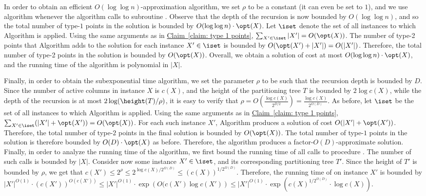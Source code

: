\documentclass[11pt]{article}
\numberwithin{equation}{section}
\theoremstyle{definition}
\theoremstyle{plain}
\newcommand{\expref}[2]{\hyperref[#2]{#1~\ref{#2}}}
\begin{document}
In order to obtain an efficient $O(\log\log n)$-approximation algorithm, we set $\rho$ to be a constant (it can even be set to $1$), and we use  algorithm \leafBST whenever the algorithm calls to subroutine \leafBST. Observe that the depth of the recursion is now bounded by $O(\log\log n)$, and so the total number of type-$1$ points in the solution is bounded by $O(\log\log n)\cdot \opt(X)$. Let $\iset$ denote the set of all instances to which Algorithm \leafBST is applied. Using the same arguments as in \expref{Claim}{claim: type 1 points}, $\sum_{X'\in \iset}|X'|=O(\opt(X))$. The number of type-2 points that Algorithm \leafBST adds to the solution for each instance $X'\in \iset$ is bounded by $O(\opt(X') + |X'|)=O(|X'|)$. Therefore, the total number of type-2 points in the solution is bounded by $O(\opt(X))$. Overall, we obtain a solution of cost at most $O(\log\log n)\cdot \opt(X)$, and the running time of the algorithm is polynomial in $|X|$.


Finally, in order to obtain the subexponential time algorithm, we set the parameter $\rho$ to be such that the recursion depth is bounded by $D$. 
Since the number of active columns in instance $X$ is $c(X)$, and the height of the partitioning tree $T$ is bounded by $2\log c(X)$, while the depth of the recursion is at most $2\log(\height(T)/\rho)$, it is easy to verify that $\rho=O\left (\frac{\log c(X)}{2^{D/2}}\right )=\frac{\log c(X)}{2^{\Omega(D)}}$.  As before, let $\iset$ be the set of all instances to which Algorithm \leafBST is applied.
 Using the same arguments as in \expref{Claim}{claim: type 1 points}, $\sum_{X'\in \iset}(|X'|+\opt(X'))=O(\opt(X))$. For each such instance $X'$, Algorithm \leafBST produces a solution of cost $O(|X'|+\opt(X'))$. Therefore, the total number of type-$2$ points in the final solution is bounded by $O(\opt(X))$. The total number of type-$1$ points  in the solution is therefore bounded by $O(D)\cdot \opt(X)$ as before. Therefore, the algorithm produces a factor-$O(D)$-approximate solution. Finally, in order to analyze the running time of the algorithm, we first bound the running time of all calls to procedure \leafBST. The number of such calls is bounded by $|X|$. Consider now some instance $X'\in \iset$, and its corresponding partitioning tree $T'$. Since the height of $T'$ is bounded by $\rho$, we get that $c(X')\leq 2^{\rho}\leq 2^{\log c(X)/2^{\Omega(D)}}\leq (c(X))^{1/2^{\Omega(D)}}$. 
 Therefore, the running time of \leafBST on instance $X'$ is bounded by $|X'|^{O(1)}\cdot (c(X'))^{O(c(X'))}\leq |X'|^{O(1)}\cdot \exp\left({O(c(X')\log c(X')}\right )\leq |X'|^{O(1)}\cdot \exp\left({c(X)^{1/2^{\Omega(D)}}\cdot \log c(X)}\right )$.
 
\end{document}
